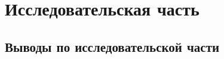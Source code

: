 \clearpage
\section{Исследовательская часть}















\clearpage
\subsection{Выводы по исследовательской части}
